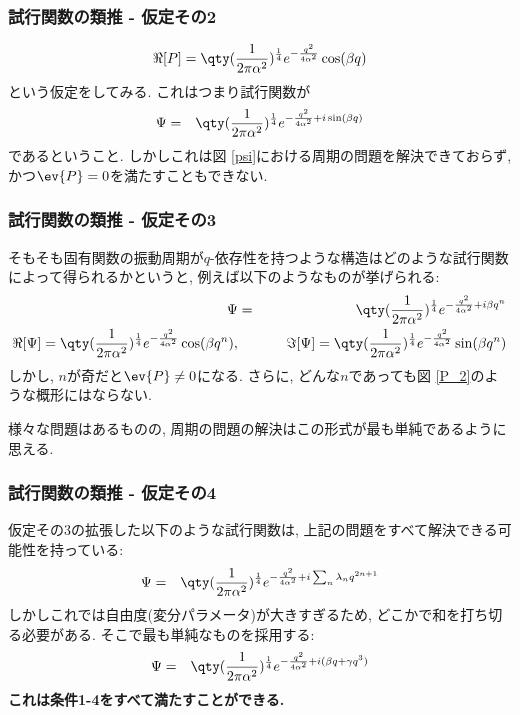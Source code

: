 \documentclass[10.5pt,a4paper]{jreport}
\begin{document}
\subsubsection{試行関数の類推 - 仮定その2}
\begin{eqnarray}
  \Re[P] = \qty(\frac{1}{2\pi\alpha^2})^\frac14e^{-\frac{q^2}{4\alpha^2}}\cos(\beta q)
\end{eqnarray}
という仮定をしてみる. これはつまり試行関数が
\begin{eqnarray}
  \Psi &=& \qty(\frac{1}{2\pi\alpha^2})^\frac14e^{-\frac{q^2}{4\alpha^2} + i \sin(\beta q)}
\end{eqnarray}
であるということ. しかしこれは図 \ref{psi}における周期の問題を解決できておらず, かつ$\ev{P}=0$を満たすこともできない.

\subsubsection{試行関数の類推 - 仮定その3}
そもそも固有関数の振動周期が$q$-依存性を持つような構造はどのような試行関数によって得られるかというと, 例えば以下のようなものが挙げられる:
\begin{eqnarray}
  \Psi &=& \qty(\frac{1}{2\pi\alpha^2})^\frac14e^{-\frac{q^2}{4\alpha^2} + i\beta q^n}\\
  \Re[\Psi] = \qty(\frac{1}{2\pi\alpha^2})^\frac14e^{-\frac{q^2}{4\alpha^2}}\cos(\beta q^n), &&\hspace{0.5cm}\Im[\Psi] = \qty(\frac{1}{2\pi\alpha^2})^\frac14e^{-\frac{q^2}{4\alpha^2}}\sin(\beta q^n)
\end{eqnarray}
しかし, $n$が奇だと$\ev{P}\neq0$になる. さらに, どんな$n$であっても図 \ref{P_2}のような概形にはならない. 

様々な問題はあるものの, 周期の問題の解決はこの形式が最も単純であるように思える.

\subsubsection{試行関数の類推 - 仮定その4}
仮定その3の拡張した以下のような試行関数は, 上記の問題をすべて解決できる可能性を持っている:
\begin{eqnarray}
  \Psi &=& \qty(\frac{1}{2\pi\alpha^2})^\frac14e^{-\frac{q^2}{4\alpha^2} + i\sum_n \lambda_nq^{2n+1}} \label{trial-assumption}
\end{eqnarray}
しかしこれでは自由度(変分パラメータ)が大きすぎるため, どこかで和を打ち切る必要がある. そこで最も単純なものを採用する:
\begin{eqnarray}
  \Psi &=& \qty(\frac{1}{2\pi\alpha^2})^\frac14e^{-\frac{q^2}{4\alpha^2} + i(\beta q + \gamma q^3)}\label{trial}
\end{eqnarray}
\textbf{これは条件1-4をすべて満たすことができる.}
\end{document}
